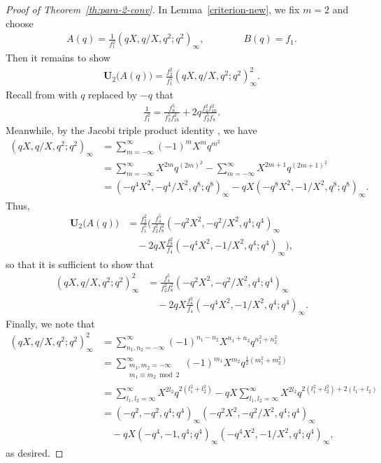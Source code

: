 \documentclass[12pt,reqno]{amsart}
\numberwithin{equation}{section}
\theoremstyle{plain}
\theoremstyle{definition}
\theoremstyle{named}
\newcommand{\UU}{\mathbf{U}}
\begin{document}
\begin{proof}[Proof of Theorem~\ref{th:para-2-conv}]
	In Lemma~\ref{criterion-new}, we fix $m=2$ and choose
	\begin{align*}
		A(q) = \frac{1}{f_1^2} (qX,q/X,q^2;q^2)_\infty, \qquad\qquad B(q) = f_1.
	\end{align*}
	Then it remains to show
	\begin{align*}
		\UU_2\big(A(q)\big) = \frac{f_2^2}{f_1^5} (qX,q/X,q^2;q^2)_\infty^2.
	\end{align*}
	Recall from \cite[p.~14, eq.~(1.9.4)]{Hir} with $q$ replaced by $-q$ that
	\begin{align*}
		 \frac{1}{f_1^2}=\frac{f_8^5}{f_2^5f_{16}^2}+2q\frac{f_4^2f_{16}^2}{f_2^5f_8}.
	\end{align*}
	Meanwhile, by the Jacobi triple product identity \cite[p.~1, eq.~(1.1.1)]{Hir}, we have
	\begin{align*}
		(qX,q/X,q^2;q^2)_\infty &= \sum_{m=-\infty}^\infty (-1)^m X^m q^{m^2}\\
		&= \sum_{m=-\infty}^\infty X^{2m} q^{(2m)^2} - \sum_{m=-\infty}^\infty X^{2m+1} q^{(2m+1)^2}\\
		&= (-q^4X^2, -q^4/X^2, q^{8};q^{8})_\infty - qX(-q^{8}X^2,-1/X^2,q^{8};q^{8})_\infty.
	\end{align*}
	Thus,
	\begin{align*}
		\UU_2\big(A(q)\big) &= \frac{f_2^2}{f_1^5} \Bigg(\frac{f_4^5}{f_2^2f_8^2}(-q^2X^2,-q^2/X^2,q^4;q^4)_\infty \\
		&\quad-2qX \frac{f_8^2}{f_4}(-q^4X^2,-1/X^2,q^4;q^4)_\infty\Bigg),
	\end{align*}
	so that it is sufficient to show that
	\begin{align*}
		(qX,q/X,q^2;q^2)_\infty^2 &= \frac{f_4^5}{f_2^2f_8^2}(-q^2X^2,-q^2/X^2,q^4;q^4)_\infty\\
		&\quad-2qX \frac{f_8^2}{f_4}(-q^4X^2,-1/X^2,q^4;q^4)_\infty.
	\end{align*}
	Finally, we note that
	\begin{align*}
		(qX,q/X,q^2;q^2)_\infty^2 &= \sum_{n_1,n_2=-\infty}^\infty (-1)^{n_1-n_2} X^{n_1+n_2} q^{n_1^2+n_2^2}\\
		&= \sum_{\substack{m_1,m_2=-\infty\\m_1\equiv m_2 \bmod{2}}}^\infty (-1)^{m_1} X^{m_2} q^{\frac{1}{2}(m_1^2+m_2^2)}\\
		&= \sum_{l_1,l_2=\infty}^\infty X^{2l_2} q^{2(l_1^2+l_2^2)} - qX \sum_{l_1,l_2=\infty}^\infty X^{2l_2} q^{2(l_1^2+l_2^2)+2(l_1+l_2)}\\
		&= (-q^2,-q^2,q^4;q^4)_\infty(-q^2X^2,-q^2/X^2,q^4;q^4)_\infty\\
		&\quad - qX(-q^4,-1,q^4;q^4)_\infty(-q^4X^2,-1/X^2,q^4;q^4)_\infty,
	\end{align*}
	as desired.
\end{proof}
\end{document}
